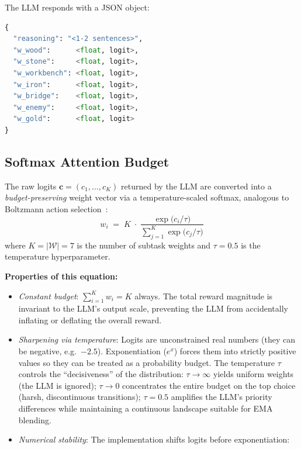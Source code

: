 The LLM responds with a JSON object:
\begin{lstlisting}[style=code, language=Python, caption={Schema of the LLM response.}, label={lst:llm_response}]
{
  "reasoning": "<1-2 sentences>",
  "w_wood":      <float, logit>,
  "w_stone":     <float, logit>,
  "w_workbench": <float, logit>,
  "w_iron":      <float, logit>,
  "w_bridge":    <float, logit>,
  "w_enemy":     <float, logit>,
  "w_gold":      <float, logit>
}
\end{lstlisting}

\subsection{Softmax Attention Budget}
\label{sec:softmax_budget}

The raw logits $\boldsymbol{c}=(c_1,\dots,c_K)$ returned by the LLM are
converted into a \emph{budget-preserving} weight vector via a
temperature-scaled softmax, analogous to Boltzmann action selection~\parencite{Sutton_Barto_2020}:
\begin{equation}
\label{eq:softmax_budget}
\boxed{
    w_i
    \;=\;
    K \;\cdot\;
    \frac{
        \exp\!\bigl(c_i / \tau\bigr)
    }{
        \displaystyle\sum_{j=1}^{K}
        \exp\!\bigl(c_j / \tau\bigr)
    }
}
\end{equation}
where $K=|\mathcal{W}|=7$ is the number of subtask weights and
$\tau=0.5$ is the temperature hyperparameter.

\noindent
\textbf{Properties of this equation:}
\begin{itemize}[nosep]
    \item \emph{Constant budget}: $\sum_{i=1}^{K} w_i = K$ always.
          The total reward magnitude is invariant to the LLM's output scale,
          preventing the LLM from accidentally inflating or deflating
          the overall reward.
    \item \emph{Sharpening via temperature}: Logits are unconstrained
          real numbers (they can be negative, e.g.\ $-2.5$).
          Exponentiation ($e^x$) forces them into strictly positive
          values so they can be treated as a probability budget.
          The temperature $\tau$ controls the ``decisiveness'' of the
          distribution:
          $\tau\to\infty$ yields uniform weights (the LLM is ignored);
          $\tau\to 0$ concentrates the entire budget on the top choice
          (harsh, discontinuous transitions);
          $\tau=0.5$ amplifies the LLM's priority differences while
          maintaining a continuous landscape suitable for EMA blending.
    \item \emph{Numerical stability}: The implementation shifts logits
          before exponentiation:
\end{itemize}

